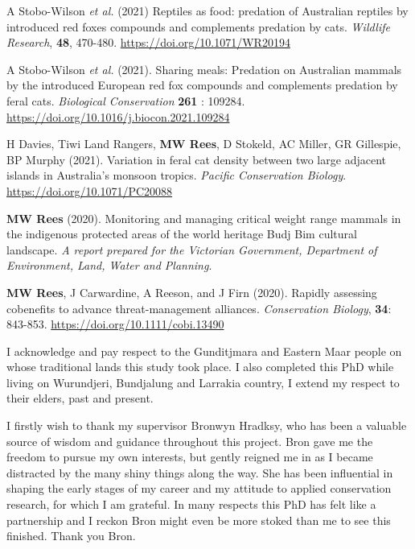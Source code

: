 \documentclass[11pt,a4paper,titlepage,twoside,openright]{style/unimelbthesis}
\begin{document}
\begin{frontmatter}
\begin{preface}
    A Stobo-Wilson \emph{et al.} (2021) Reptiles as food: predation of Australian reptiles by introduced red foxes compounds and complements predation by cats. \emph{Wildlife Research}, \textbf{48}, 470-480. \url{https://doi.org/10.1071/WR20194}
    
    A Stobo-Wilson \emph{et al.} (2021). Sharing meals: Predation on Australian mammals by the introduced European red fox compounds and complements predation by feral cats. \emph{Biological Conservation} \textbf{261} : 109284. \url{https://doi.org/10.1016/j.biocon.2021.109284}
    
    H Davies, Tiwi Land Rangers, \textbf{MW Rees}, D Stokeld, AC Miller, GR Gillespie, BP Murphy (2021). Variation in feral cat density between two large adjacent islands in Australia's monsoon tropics. \emph{Pacific Conservation Biology}. \url{https://doi.org/10.1071/PC20088}
    
    \textbf{MW Rees} (2020). Monitoring and managing critical weight range mammals in the indigenous protected areas of the world heritage Budj Bim cultural landscape. \emph{A report prepared for the Victorian Government, Department of Environment, Land, Water and Planning}.
    
    \textbf{MW Rees}, J Carwardine, A Reeson, and J Firn (2020). Rapidly assessing cobenefits to advance threat-management alliances. \emph{Conservation Biology}, \textbf{34}: 843-853. \url{https://doi.org/10.1111/cobi.13490}
  \end{preface}
  \begin{acknowledgements}
    I acknowledge and pay respect to the Gunditjmara and Eastern Maar people on whose traditional lands this study took place. I also completed this PhD while living on Wurundjeri, Bundjalung and Larrakia country, I extend my respect to their elders, past and present.
    
    I firstly wish to thank my supervisor Bronwyn Hradksy, who has been a valuable source of wisdom and guidance throughout this project. Bron gave me the freedom to pursue my own interests, but gently reigned me in as I became distracted by the many shiny things along the way. She has been influential in shaping the early stages of my career and my attitude to applied conservation research, for which I am grateful. In many respects this PhD has felt like a partnership and I reckon Bron might even be more stoked than me to see this finished. Thank you Bron.
    

\end{acknowledgements}
\end{frontmatter}
\end{document}
